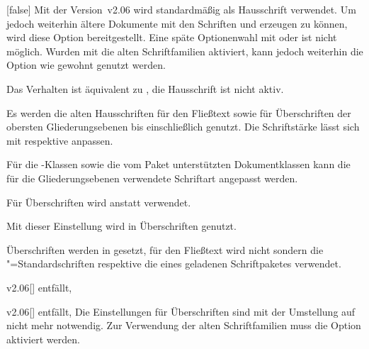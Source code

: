%
\begin{Declaration}[v2.06]{}[false]
\printdeclarationlist%
%
Mit der Version~v2.06 wird standardmäßig \OpenSans als Hausschrift verwendet. 
Um jedoch weiterhin ältere Dokumente mit den Schriften \Univers und \DIN 
erzeugen zu können, wird diese Option bereitgestellt.
 Eine späte Optionenwahl mit  oder  ist 
nicht möglich. Wurden mit  die alten Schriftfamilien 
aktiviert, kann jedoch weiterhin die Option  wie gewohnt 
genutzt werden.
%
\begin{values}{}
\item[false]
  Das Verhalten ist äquivalent zu , die Hausschrift ist 
  nicht aktiv.
\item[true]
  Es werden die alten Hausschriften \Univers für den Fließtext sowie \DIN für 
  Überschriften der obersten Gliederungsebenen bis einschließlich 
   genutzt. Die Schriftstärke lässt sich mit 
   respektive  anpassen.
\end{values}
%
Für die \TUDScript-Klassen sowie die vom Paket  
unterstützten Dokumentklassen kann die für die Gliederungsebenen verwendete 
Schriftart angepasst werden.
%
\begin{values}{}
\item[nodin]
  Für Überschriften wird \Univers anstatt \DIN verwendet.
\item[din]
  Mit dieser Einstellung wird \DIN in Überschriften genutzt. 
\item[onlydin]
  Überschriften werden in \DIN gesetzt, für den Fließtext wird nicht \Univers 
  sondern die "=Standardschriften respektive die eines geladenen 
  Schriftpaketes verwendet.
\end{values}
\end{Declaration}

\begin{Obsolete}{v2.06}[]{}{%
  entfällt, %
}
\begin{Obsolete}{v2.06}[]{}{%
  entfällt, %
}
\printobsoletelist%
%
Die Einstellungen für Überschriften sind mit der Umstellung auf \OpenSans nicht 
mehr notwendig. Zur Verwendung der alten Schriftfamilien muss die Option 
 aktiviert werden.
\end{Obsolete}
\end{Obsolete}

